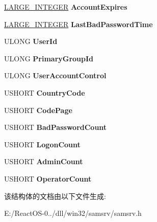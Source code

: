 \begin{DoxyCompactItemize}
\hyperlink{union___l_a_r_g_e___i_n_t_e_g_e_r}{L\+A\+R\+G\+E\+\_\+\+I\+N\+T\+E\+G\+ER} {\bfseries Account\+Expires}
\item 
\mbox{\label{struct___s_a_m___u_s_e_r___f_i_x_e_d___d_a_t_a_a07916af85c49b927912bf01da60faa31}} 
\hyperlink{union___l_a_r_g_e___i_n_t_e_g_e_r}{L\+A\+R\+G\+E\+\_\+\+I\+N\+T\+E\+G\+ER} {\bfseries Last\+Bad\+Password\+Time}
\item 
\mbox{\label{struct___s_a_m___u_s_e_r___f_i_x_e_d___d_a_t_a_ab699dd55055f6344f179003be40c0297}} 
U\+L\+O\+NG {\bfseries User\+Id}
\item 
\mbox{\label{struct___s_a_m___u_s_e_r___f_i_x_e_d___d_a_t_a_a28a39da704bbc30f1e1ac1c3f92b8064}} 
U\+L\+O\+NG {\bfseries Primary\+Group\+Id}
\item 
\mbox{\label{struct___s_a_m___u_s_e_r___f_i_x_e_d___d_a_t_a_a095d35c748426d65aa91290ce36d791f}} 
U\+L\+O\+NG {\bfseries User\+Account\+Control}
\item 
\mbox{\label{struct___s_a_m___u_s_e_r___f_i_x_e_d___d_a_t_a_a8c1bffe382215f4342d353fae47ed8a1}} 
U\+S\+H\+O\+RT {\bfseries Country\+Code}
\item 
\mbox{\label{struct___s_a_m___u_s_e_r___f_i_x_e_d___d_a_t_a_ab1d099190e8730e94e91859e1ccad5ce}} 
U\+S\+H\+O\+RT {\bfseries Code\+Page}
\item 
\mbox{\label{struct___s_a_m___u_s_e_r___f_i_x_e_d___d_a_t_a_a5e3f5a7b9ce927ec125d5dc9fcc768f0}} 
U\+S\+H\+O\+RT {\bfseries Bad\+Password\+Count}
\item 
\mbox{\label{struct___s_a_m___u_s_e_r___f_i_x_e_d___d_a_t_a_ad4688f089e7276fc4e627994fefdf664}} 
U\+S\+H\+O\+RT {\bfseries Logon\+Count}
\item 
\mbox{\label{struct___s_a_m___u_s_e_r___f_i_x_e_d___d_a_t_a_ac9e881f955d689902e3acc454607c873}} 
U\+S\+H\+O\+RT {\bfseries Admin\+Count}
\item 
\mbox{\label{struct___s_a_m___u_s_e_r___f_i_x_e_d___d_a_t_a_ac0aefba16aeb31401897e4cd7154309f}} 
U\+S\+H\+O\+RT {\bfseries Operator\+Count}
\end{DoxyCompactItemize}


该结构体的文档由以下文件生成\+:\begin{DoxyCompactItemize}
\item 
E\+:/\+React\+O\+S-\/0../dll/win32/samsrv/samsrv.\+h\end{DoxyCompactItemize}
